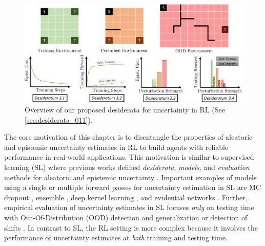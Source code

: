 \begin{figure}[t]
    \centering
    \includegraphics[width=.99\linewidth]{sections/011_icml2022/resources/diagram-cropped_2.pdf}
    \caption{Overview of our proposed desiderata for uncertainty in RL (See \cref{sec:desiderata_011}).}
    \label{fig:diagram}
\end{figure}

The core motivation of this chapter is to disentangle the properties of aleatoric and epistemic uncertainty estimates in RL to build agents with reliable performance in real-world applications. This motivation is similar to supervised learning (SL) where previous works defined \emph{desiderata}, \emph{models}, and \emph{evaluation} methods for aleatoric and epistemic uncertainty \citep{uncertainty-deep-learning, review-uncertainty-dl, dataset-shift, robustness-uncertainty-dirichlet}. Important examples of models using a single or multiple forward passes for uncertainty estimation in SL are MC dropout \citep{dropout}, ensemble \citep{ensembles, hyper-ensembles, batch-ensembles}, deep kernel learning \citep{simple-baseline-uncertainty, due, duq, uceloss}, and evidential networks \citep{charpentier2020, PriorNetworks, natpn, evidential-regression}. Further, empirical evaluation of uncertainty estimates in SL focuses \emph{only} on testing time with Out-Of-Distribution (OOD) detection and generalization or detection of shifts \citep{dataset-shift, shifts-dataset}. In contrast to SL, the RL setting is more complex because it involves the performance of uncertainty estimates at \emph{both} training and testing time.

